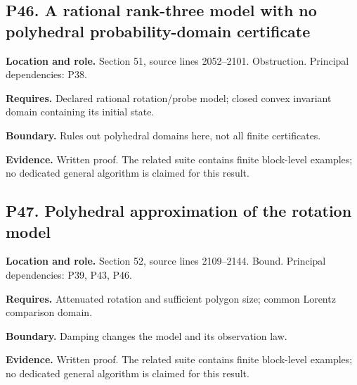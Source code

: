 \documentclass[11pt,oneside,openany]{book}
\numberwithin{equation}{section}
\begin{document}
\par\noindent\begin{minipage}{\textwidth}
\subsection{P46. A rational rank-three model with no polyhedral
probability-domain
certificate}\label{LSMRegister:p46.-a-rational-rank-three-model-with-no-polyhedral-probability-domain-certificate}

\textbf{Location and role.} Section 51, source lines 2052--2101.
Obstruction. Principal dependencies: P38.

\textbf{Requires.} Declared rational rotation/probe model; closed convex
invariant domain containing its initial state.

\textbf{Boundary.} Rules out polyhedral domains here, not all finite
certificates.

\textbf{Evidence.} Written proof. The related suite contains finite
block-level examples; no dedicated general algorithm is claimed for this
result.
\end{minipage}\par\medskip

\par\noindent\begin{minipage}{\textwidth}
\subsection{P47. Polyhedral approximation of the rotation
model}\label{LSMRegister:p47.-polyhedral-approximation-of-the-rotation-model}

\textbf{Location and role.} Section 52, source lines 2109--2144. Bound.
Principal dependencies: P39, P43, P46.

\textbf{Requires.} Attenuated rotation and sufficient polygon size;
common Lorentz comparison domain.

\textbf{Boundary.} Damping changes the model and its observation law.

\textbf{Evidence.} Written proof. The related suite contains finite
block-level examples; no dedicated general algorithm is claimed for this
result.
\end{minipage}\par\medskip
\end{document}
